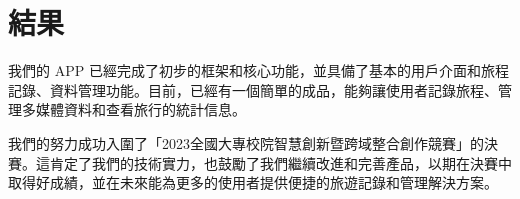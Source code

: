 \section{結果}

我們的 APP 已經完成了初步的框架和核心功能，並具備了基本的用戶介面和旅程記錄、資料管理功能。目前，已經有一個簡單的成品，能夠讓使用者記錄旅程、管理多媒體資料和查看旅行的統計信息。

我們的努力成功入圍了「2023全國大專校院智慧創新暨跨域整合創作競賽」的決賽。這肯定了我們的技術實力，也鼓勵了我們繼續改進和完善產品，以期在決賽中取得好成績，並在未來能為更多的使用者提供便捷的旅遊記錄和管理解決方案。